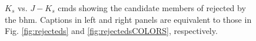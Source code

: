  \begin{figure}[ht!]
\begin{center}
\caption{$K_s$ vs. $J-K_s$ \glspl{cmd} showing the candidate members of \citet{Bouy2015} rejected by the \gls{bhm}. Captions in left and right panels are equivalent to those in Fig. \ref{fig:rejecteds} and \ref{fig:rejectedsCOLORS}, respectively.}
\label{fig:rejectedsJ_K}
\end{center}
\end{figure}

